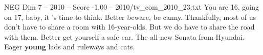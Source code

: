 \begin{textsample}{NEG Dim 7 – 2010 – Score -1.00 – 2010/tv\_com\_2010\_23.txt}  \label{ex:f7_neg_026}
You are 16, going on 17, baby, it 's time to think.
Better beware, be canny.
Thankfully, most of us don't have to share a room with 16-year-olds.
But we do have to share the road with them.
Better get yourself a safe car.
The all-new Sonata from Hyundai.
Eager \textbf{young} lads and ruleways and cats.

\end{textsample}
